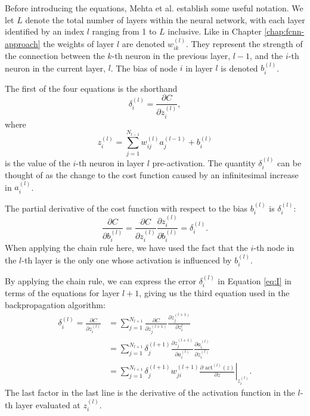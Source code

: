 \documentclass[a4paper, UKenglish, 11pt]{uiomaster}
\begin{document}
Before introducing the equations, Mehta et al. establish some useful notation. We let $L$ denote the total number of layers within the neural network, with each layer identified by an index $l$ ranging from 1 to $L$ inclusive. Like in Chapter \ref{chap:fcnn-approach} the weights of layer \(l\) are denoted $w^{(l)}_{ik}$. They represent the strength of the connection between the $k$-th neuron in the previous layer, $l-1$, and the $i$-th neuron in the current layer, $l$. The bias of node \(i\) in layer \(l\) is denoted $b^{(l)}_i$.

The first of the four equations is the shorthand
\begin{equation}
  \delta_i^{(l)} = \frac{\partial C}{\partial z_i^{(l)}},
  \label{eq:I}
\end{equation}
where
\begin{equation}
  z_i^{(l)} = \sum_{j = 1}^{N_{l - 1}} w_{i j}^{(l)} a_j^{(l - 1)} + b_i^{(l)}
  \label{eq:z_i}
\end{equation}
is the value of the \(i\)-th neuron in layer \(l\) pre-activation.
The quantity \(\delta_i^{(l)}\) can be thought of as the change to the cost function caused by an infinitesimal increase in $a_i^{(l)}$.

The partial derivative of the cost function with respect to the bias $b_i^{(l)}$ is \(\delta_i^{(l)}\):
\begin{equation}
  \frac{\partial C}{\partial b_i^{(l)}}
    = \frac{\partial C}{\partial z_i^{(l)}} \frac{\partial z_i^{(l)}}{\partial b_i^{(l)}}
    = \delta_i^{(l)}.
  \label{eq:II}
\end{equation}
When applying the chain rule here, we have used the fact that the \(i\)-th node in the \(l\)-th layer is the only one whose activation is influenced by \(b_i^{(l)}\).

By applying the chain rule, we can express the error $\delta_i^{(l)}$ in Equation \ref{eq:I} in terms of the equations for layer $l+1$, giving us the third equation used in the backpropagation algorithm:
\begin{align}
  \delta_i^{(l)} = \frac{\partial C}{\partial z_i^{(l)}}
    &= \sum_{j = 1}^{N_{l + 1}} \frac{\partial C}{\partial z_j^{(l+1)}} \frac{\partial z_j^{(l+1)}}{\partial z_i^l} \nonumber \\
    &= \sum_{j = 1}^{N_{l + 1}} \delta_j^{(l+1)}
      \frac{\partial z_j^{(l+1)}}{\partial a_i^{(l)}}
      \frac{\partial a_i^{(l)}}{\partial z_i^{(l)}} \nonumber \\
    &= \sum_{j = 1}^{N_{l + 1}} \delta_j^{(l+1)} w_{ji}^{(l+1)}
      \left. \frac{\partial \text{ act}^{(l)}(z)}{\partial z} \right|_{z_i^{(l)}}. \label{eq:III}
\end{align}
The last factor in the last line is the derivative of the activation function in the \(l\)-th layer evaluated at \(z_i^{(l)}\).
\end{document}
